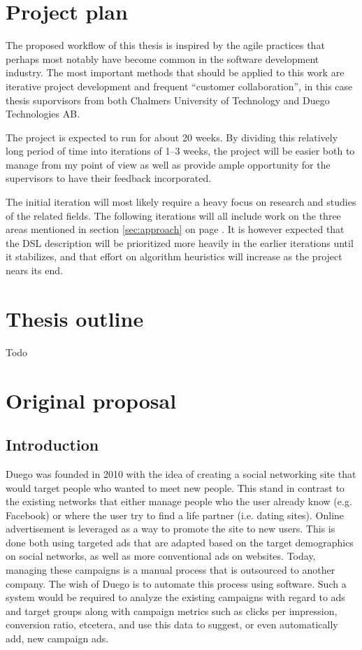 \documentclass[a4paper]{article}
\begin{document}
\section{Project plan}
The proposed workflow of this thesis is inspired by the agile practices that perhaps most notably have become 
common in the software development industry. The most important methods that should be applied to this work are
iterative project development and frequent ``customer collaboration'', in this case thesis suporvisors from both
Chalmers University of Technology and Duego Technologies AB.

The project is expected to run for about 20 weeks. By dividing this relatively long period of time into iterations
of 1--3 weeks, the project will be easier both to manage from my point of view as well as provide ample opportunity
for the supervisors to have their feedback incorporated.

The initial iteration will most likely require a heavy focus on research and studies of the related fields. The following
iterations will all include work on the three areas mentioned in section \ref{sec:approach} on page \pageref{sec:approach}.
It is however expected that the DSL description will be prioritized more heavily in the earlier iterations until it
stabilizes, and that effort on algorithm heuristics will increase as the project nears its end.

\section{Thesis outline}
Todo

\section{Original proposal}

\subsection{Introduction}
Duego was founded in 2010 with the idea of creating a social networking site that would target people who wanted to meet new 
people. This stand in contrast to the existing networks that either manage people who the user already know (e.g. Facebook) 
or where the user try to find a life partner (i.e. dating sites). Online advertisement is leveraged as a way to promote the 
site to new users. This is done both using targeted ads that are adapted based on the target demographics on social networks, 
as well as more conventional ads on websites. Today, managing these campaigns is a manual process that is outsourced to 
another company. The wish of Duego is to automate this process using software. Such a system would be required to analyze 
the existing campaigns with regard to ads and target groups along with campaign metrics such as clicks per impression, 
conversion ratio, etcetera, and use this data to suggest, or even automatically add, new campaign ads.
\end{document}
